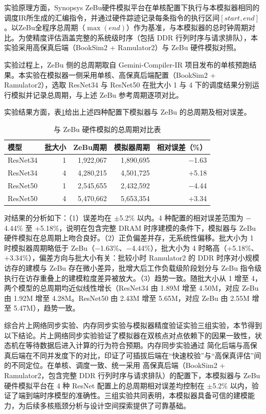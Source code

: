 实验原理方面，Synopsys ZeBu硬件模拟平台在单核配置下执行与本模拟器相同的调度IR所生成的汇编指令，并通过硬件踪迹记录每条指令的执行区间$[\mathit{start},\mathit{end}]$。以ZeBu全程序总周期（$\max(\mathit{end})$）作为基准，与本模拟器的总时钟周期对比。为使精度评估涵盖完整的系统级时序（包括 DDR 行列时序与请求排队），本实验采用高保真后端（BookSim2 + Ramulator2）与 ZeBu 硬件模拟对照。

实验过程上，ZeBu 侧的总周期取自 Gemini-Compiler-IR 项目发布的单核预跑结果。本实验在模拟器一侧采用单核、高保真后端配置（BookSim2 + Ramulator2），选取 ResNet34 与 ResNet50 在批大小 1 与 4 下的调度结果分别运行模拟并记录总周期，与上述 ZeBu 参考周期逐项对比。

实验结果方面，表\ref{tab:zebu_validation}给出上述四种配置下模拟器与 ZeBu 的总周期及相对误差。

\begin{table}[H]
  \centering
  \caption{与 ZeBu 硬件模拟的总周期对比表}
  \label{tab:zebu_validation}
  \small
  \begin{tabular*}{\textwidth}{@{\extracolsep{\fill}}lrrrr}
    \toprule
    模型 & 批大小 & ZeBu周期 & 模拟器周期 & 相对误差（\%） \\
    \midrule
    ResNet34 & 1  & 1,922,067 & 1,890,695 & $-$1.63 \\
    ResNet34 & 4  & 4,280,215 & 4,501,725 & +5.18 \\
    ResNet50 & 1  & 2,545,655 & 2,432,592 & $-$4.44 \\
    ResNet50 & 4  & 5,470,662 & 5,653,354 & +3.34 \\
    \bottomrule
  \end{tabular*}
\end{table}

对结果的分析如下：（1）误差均在 $\pm$5.2\% 以内。4 种配置的相对误差范围为 $-$4.44\% 至 +5.18\%，说明在包含完整 DRAM 时序建模的条件下，模拟器与 ZeBu 硬件模拟在总周期上吻合良好。（2）正负偏差并存，无系统性偏移。批大小为 1 时模拟器周期略低于 ZeBu（$-$1.63\%、$-$4.44\%），批大小为 4 时略高（+5.18\%、+3.34\%），偏差方向与批大小有关：批较小时 Ramulator2 的 DDR 时序对小规模访存的建模与 ZeBu 存在微小差异，批增大后工作负载级阶段划分与 ZeBu 指令级执行在访存重叠上的建模粒度差异被放大。（3）趋势一致。随批大小从 1 增至 4，两个模型的总周期均近似线性增长（ResNet34 由 1.89M 增至 4.50M，对应 ZeBu 由 1.92M 增至 4.28M。ResNet50 由 2.43M 增至 5.65M，对应 ZeBu 由 2.55M 增至 5.47M），趋势一致。


综合片上网络同步实验、内存同步实验与模拟器精度验证实验三组实验，本节得到以下结论。片上网络同步实验验证了模拟器在双核点对点依赖下的因果一致性，状态机在等待数据后进入计算的行为符合预期。内存同步实验通过 简化后端与高保真后端在不同并发度下的对比，印证了可插拔后端在“快速校验”与“高保真评估”间的不同定位。在单核、调度一致、统一采用 高保真后端（BookSim2 + Ramulator2，包含完整 DDR 行列时序与请求排队）的配置下，本模拟器与 ZeBu 硬件模拟平台在 4 种 ResNet 配置上的总周期相对误差均控制在 $\pm$5.2\% 以内，验证了端到端时序模型的准确性。三组实验共同表明，本模拟器具备可信的建模能力，为后续多核瓶颈分析与设计空间探索提供了可靠基础。

